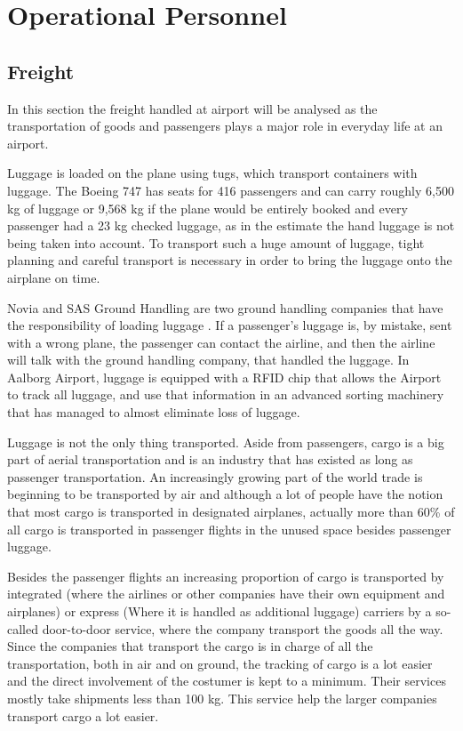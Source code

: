 \section{Operational Personnel}
\subsection{Freight}
In this section the freight handled at airport will be analysed as the transportation of goods and passengers plays a major role in everyday life at an airport. 

Luggage is loaded on the plane using tugs, which transport containers with luggage. The Boeing 747 has seats for 416 passengers\cite{freight_boing} and can carry roughly 6,500 kg of luggage or 9,568 kg if the plane would be entirely booked and every passenger had a 23 kg checked luggage, as in the estimate the hand luggage is not being taken into account. To transport such a huge amount of luggage, tight planning and careful transport is necessary in order to bring the luggage onto the airplane on time.

Novia and SAS Ground Handling are two ground handling companies that have the responsibility of loading luggage \cite{mistet_bagage}. If a passenger's luggage is, by mistake, sent with a wrong plane, the passenger can contact the airline, and then the airline will talk with the ground handling company, that handled the luggage. In Aalborg Airport, luggage is equipped with a RFID chip that allows the Airport to track all luggage, and use that information in an advanced sorting machinery that has managed to almost eliminate loss of luggage.


Luggage is not the only thing transported. Aside from passengers, cargo is a big part of aerial transportation and is an industry that has existed as long as passenger transportation. An increasingly growing part of the world trade is beginning to be transported by air and although a lot of people have the notion that most cargo is transported in designated airplanes, actually more than 60\% of all cargo is transported in passenger flights in the unused space besides passenger luggage. %


Besides the passenger flights an increasing proportion of cargo is transported by integrated (where the airlines or other companies have their own equipment and airplanes) or express (Where it is handled as additional luggage) 
carriers by a so-called door-to-door service, where the company transport the goods all the way. Since the companies that transport the cargo is in charge of all the transportation, both in air and on ground, the tracking of cargo is a lot easier and the direct involvement of the costumer is kept to a minimum. Their services mostly take shipments less than 100 kg. This service help the larger companies transport cargo a lot easier.

